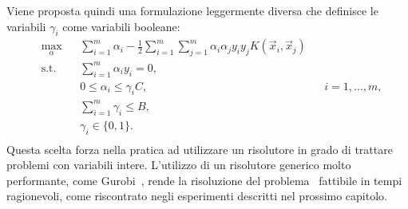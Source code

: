 Viene proposta quindi una formulazione leggermente diversa che definisce le variabili $\gamma_i$ come variabili booleane:
\begin{equation}\label{eq:budget_svc:binary_gamma_formulation}
\begin{aligned}
& \max_{\alpha}    && \sum_{i=1}^{m}\alpha_i - \frac{1}{2}\sum_{i=1}^{m}\sum_{j=1}^{m}\alpha_i\alpha_jy_iy_jK(\Vec{x}_i, \Vec{x}_j)\\
& \textrm{s.t.} && \sum_{i=1}^{m} \alpha_iy_i = 0,                   \\
&               && 0 \leq \alpha_i \leq \gamma_iC,   && i=1,\dots,m,  \\
&               && \sum_{i=1}^{m} \gamma_i \leq B,                  \\
&               && \gamma_i \in \{0,1\}.                            \\
\end{aligned}
\end{equation}
Questa scelta forza nella pratica ad utilizzare un risolutore in grado di trattare problemi con variabili intere.
L'utilizzo di un risolutore generico molto performante, come Gurobi~\cite{gurobi}, rende la risoluzione del problema~ fattibile in tempi ragionevoli, come riscontrato negli esperimenti descritti nel prossimo capitolo.
